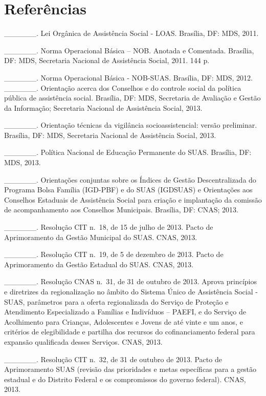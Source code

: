 \documentclass[
  letterpaper,
  DIV=11,
  numbers=noendperiod]{scrreprt}
\begin{document}

\chapter{Referências}\label{referuxeancias}

\_\_\_\_\_\_. Lei Orgânica de Assistência Social - LOAS. Brasília, DF:
MDS, 2011.

\_\_\_\_\_\_. Norma Operacional Básica -- NOB. Anotada e Comentada.
Brasília, DF: MDS, Secretaria Nacional de Assistência Social, 2011. 144
p.

\_\_\_\_\_\_. Norma Operacional Básica - NOB-SUAS. Brasília, DF: MDS,
2012. \_\_\_\_\_\_. Orientação acerca dos Conselhos e do controle social
da política pública de assistência social. Brasília, DF: MDS, Secretaria
de Avaliação e Gestão da Informação; Secretaria Nacional de Assistência
Social, 2013.

\_\_\_\_\_\_. Orientação técnicas da vigilância socioassistencial:
versão preliminar. Brasília, DF: MDS, Secretaria Nacional de Assistência
Social, 2013.

\_\_\_\_\_\_. Política Nacional de Educação Permanente do SUAS.
Brasília, DF: MDS, 2013.

\_\_\_\_\_\_. Orientações conjuntas sobre os Índices de Gestão
Descentralizada do Programa Bolsa Família (IGD-PBF) e do SUAS (IGDSUAS)
e Orientações aos Conselhos Estaduais de Assistência Social para criação
e implantação da comissão de acompanhamento aos Conselhos Municipais.
Brasília, DF: CNAS; 2013.

\_\_\_\_\_\_. Resolução CIT n.~18, de 15 de julho de 2013. Pacto de
Aprimoramento da Gestão Municipal do SUAS. CNAS, 2013.

\_\_\_\_\_\_. Resolução CIT n.~19, de 5 de dezembro de 2013. Pacto de
Aprimoramento da Gestão Estadual do SUAS. CNAS, 2013.

\_\_\_\_\_\_. Resolução CNAS n.~31, de 31 de outubro de 2013. Aprova
princípios e diretrizes da regionalização no âmbito do Sistema Único de
Assistência Social - SUAS, parâmetros para a oferta regionalizada do
Serviço de Proteção e Atendimento Especializado a Famílias e Indivíduos
-- PAEFI, e do Serviço de Acolhimento para Crianças, Adolescentes e
Jovens de até vinte e um anos, e critérios de elegibilidade e partilha
dos recursos do cofinanciamento federal para expansão qualificada desses
Serviços. CNAS, 2013.

\_\_\_\_\_\_. Resolução CIT n.~32, de 31 de outubro de 2013. Pacto de
Aprimoramento SUAS (revisão das prioridades e metas específicas para a
gestão estadual e do Distrito Federal e os compromissos do governo
federal). CNAS, 2013.
\end{document}

